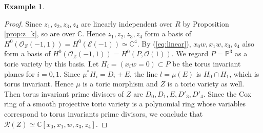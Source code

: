 \documentclass[a4paper,11pt]{amsart}
\theoremstyle{plain}
\newtheorem{conjecture}[theorem]{Conjecture}
\theoremstyle{definition}
\newtheorem{example}[theorem]{Example}
\newcommand{\C}{\mathbb{C}}
\newcommand{\p}{\mathbb{P}}
\newcommand{\R}{\mathcal{R}}
\newcommand{\Z}{\mathbb{Z}}
\newcommand{\Ox}{\mathcal{O}}
\begin{document}
\begin{example}
\begin{proof}
Since $z_1,z_2,z_3,z_4$ are linearly independent over $R$ by Proposition \ref{prop:z_k},
so are over $\C$.
Hence $z_1,z_2,z_3,z_4$ form a basis of $ H^0(\Ox_Z(-1,1))  =H^0(\mathcal{E}(-1)) \simeq \C^4$.
By (\ref{eq:linear}), $x_0w,x_1w,z_3,z_4$ also form a basis of $ H^0(\Ox_Z(-1,1)) =H^0(P, \Ox(1))$. We regard $P=\p^3$ as a toric variety by this basis.
Let $H_i=(x_iw=0) \subset P$ be the torus invariant planes for $i=0,1$.
Since $\mu^*H_i=D_i+E$, the line $l =\mu(E)$ is $H_0 \cap H_1$, which is torus invariant.
Hence $\mu$ is a toric morphism and $Z$ is a toric variety as well.
Then torus invariant prime divisors of $Z$ are $D_0,D_1,E, D'_3,D'_4$.
Since the Cox ring of a smooth projective toric variety is a polynomial ring whose variables correspond to torus invariants prime divisors,
we conclude that $\R(Z) \simeq \C[x_0,x_1,w,z_3,z_4]$.
\end{proof}



    
\end{example}
\end{document}
